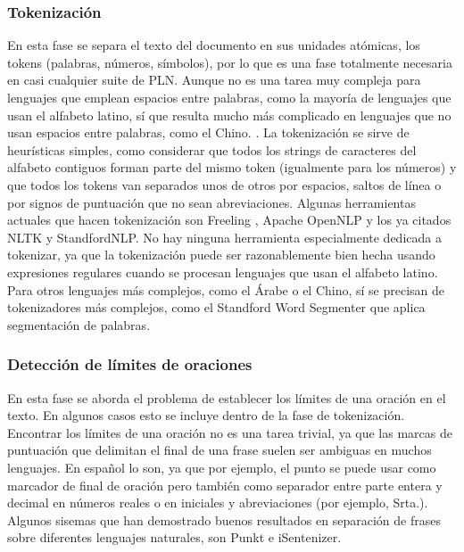 \subsubsection{Tokenización}
En esta fase se separa el texto del documento en sus unidades atómicas, los tokens (palabras, números, símbolos), por lo que es una fase totalmente necesaria en casi cualquier suite de PLN. Aunque no es una tarea muy compleja para lenguajes que emplean espacios entre palabras, como la mayoría de lenguajes que usan el alfabeto latino, sí que resulta mucho más complicado en lenguajes que no usan espacios entre palabras, como el Chino. \citet{chang2008optimizing}. \newline
La tokenización se sirve de heurísticas simples, como considerar que todos los strings de caracteres del alfabeto contiguos forman parte del mismo token (igualmente para los números) y que todos los tokens van separados unos de otros por espacios, saltos de línea o por signos de puntuación que no sean abreviaciones. Algunas herramientas actuales que hacen tokenización son \textsf{Freeling} \citet{padro2012freeling}, \textsf{Apache OpenNLP} \citet{baldridge2005opennlp} y los ya citados \textsf{NLTK} y \textsf{StandfordNLP}. No hay ninguna herramienta especialmente dedicada a tokenizar, ya que la tokenización puede ser razonablemente bien hecha usando expresiones regulares cuando se procesan lenguajes que usan el alfabeto latino. Para otros lenguajes más complejos, como el Árabe o el Chino, sí se precisan de tokenizadores más complejos, como el \textsf{Standford Word Segmenter} que aplica segmentación de palabras. 
\subsubsection{Detección de límites de oraciones}
En esta fase se aborda el problema de establecer los límites de una oración en el texto. En algunos casos esto se incluye dentro de la fase de tokenización. Encontrar los límites de una oración no es una tarea trivial, ya que las marcas de puntuación que delimitan el final de una frase suelen ser ambiguas en muchos lenguajes. En español lo son, ya que por ejemplo, el punto se puede usar como marcador de final de oración pero también como separador entre parte entera y decimal en números reales o en iniciales y abreviaciones (por ejemplo, Srta.). \newline
Algunos sisemas que han demostrado buenos resultados en separación de frases sobre diferentes lenguajes naturales, son \textsf{Punkt} \citet{kiss2006unsupervised} e \textsf{iSentenizer}\citet{wong2014isentenizer}.  
